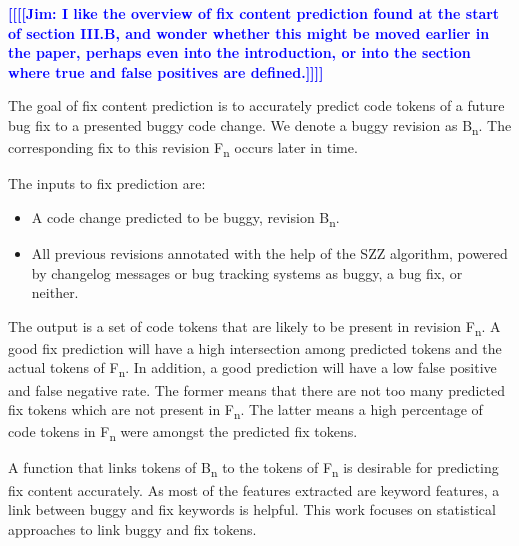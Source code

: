 \documentclass[10pt, conference, letterpaper, compsocconf]{IEEEtran}
\newcommand{\todoc}[2]{{\textcolor{#1} {\textbf{[[#2]]}}}}
\newcommand{\todored}[1]{\todoc{red}  {\textbf{[[#1]]}}}
\newcommand{\todoblue}[1]{\todoc{blue}{\textbf{[[#1]]}}}
\newcommand{\sung}[1]{\todored{Sung: #1}}
\newcommand{\jim}[1]{\todoblue{Jim: #1}}
\begin{document}
\jim{I like the overview of fix content prediction found at the start of section III.B, and wonder whether this might be moved earlier in the paper, perhaps even into the introduction, or into the section where true and false positives are defined.}

The goal of fix content prediction is to accurately predict code tokens of a future bug
fix to a presented buggy code change.
We denote a buggy revision as B\textsubscript{n}. The corresponding fix to this revision F\textsubscript{n} occurs later in time.



The inputs to fix prediction are:
\begin{itemize}
\item A code change predicted to be buggy, revision B\textsubscript{n}.
\item All previous revisions annotated with the help of the SZZ algorithm, powered by changelog messages or bug tracking systems as buggy, a bug fix, or neither.

% 
\end{itemize}

The output is a set of code tokens that are likely to be present in revision
F\textsubscript{n}. A good fix prediction will have a high intersection among
predicted tokens and the actual tokens of F\textsubscript{n}. In addition, a good
prediction will have a low false positive and false negative rate.
The former means that there are not too many predicted fix tokens which are not
present in F\textsubscript{n}. The latter means a high percentage of code
tokens in F\textsubscript{n} were amongst the predicted fix tokens.

A function that links tokens of B\textsubscript{n} to the tokens of F\textsubscript{n} is desirable for predicting fix content accurately.
As most of the features extracted are keyword features, a link between buggy and fix keywords is helpful. This work focuses on
statistical approaches to link buggy and fix tokens.
\end{document}
